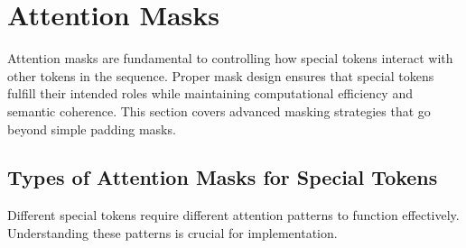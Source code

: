 
\section{Attention Masks}

Attention masks are fundamental to controlling how special tokens interact with other tokens in the sequence. Proper mask design ensures that special tokens fulfill their intended roles while maintaining computational efficiency and semantic coherence. This section covers advanced masking strategies that go beyond simple padding masks.

\subsection{Types of Attention Masks for Special Tokens}

Different special tokens require different attention patterns to function effectively. Understanding these patterns is crucial for implementation.

